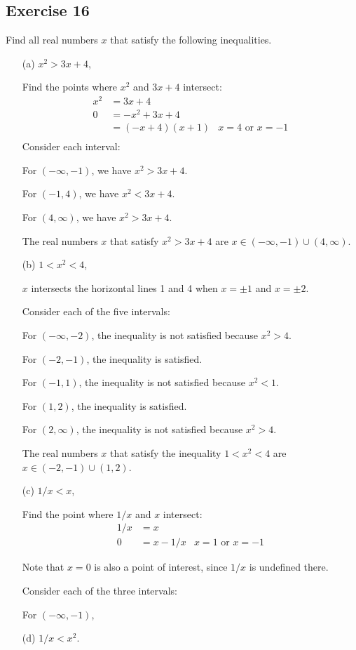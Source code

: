 \documentclass[12pt]{article}
\begin{document}
\subsection*{Exercise 16}
Find all real numbers $x$ that satisfy the following inequalities.
\begin{itemize}
\item[(a)] $x^2 > 3x + 4$,

Find the points where $x^2$ and $3x + 4$ intersect:
\begin{align*}
x^2 &= 3x + 4 \\
0 &= -x^2 + 3x + 4 \\
&= \left(-x + 4\right) \left(x + 1\right) & \text{$x = 4$ or $x = -1$}\\
\end{align*}
Consider each interval:

For $\left(-\infty, -1\right)$, we have $x^2 > 3x+4$.

For $\left(-1, 4\right)$, we have $x^2 < 3x+4$.

For $\left(4, \infty\right)$, we have $x^2 > 3x+4$.

The real numbers $x$ that satisfy $x^2 > 3x + 4$ are $x \in \left(-\infty, -1\right) \cup \left(4, \infty\right)$.
\item[(b)] $1 < x^2 < 4$,

$x$ intersects the horizontal lines 1 and 4 when $x = \pm 1$ and $x = \pm 2$.

Consider each of the five intervals:

For $\left(-\infty, -2\right)$, the inequality is not satisfied because $x^2 > 4$.

For $\left(-2, -1\right)$, the inequality is satisfied.

For $\left(-1, 1\right)$, the inequality is not satisfied because $x^2 < 1$.

For $\left(1, 2\right)$, the inequality is satisfied.

For $\left(2, \infty\right)$, the inequality is not satisfied because $x^2 > 4$.

The real numbers $x$ that satisfy the inequality $1 < x^2 < 4$ are $x \in \left(-2, -1\right) \cup \left(1, 2\right)$.
\item[(c)] $1/x < x$,

Find the point where $1/x$ and $x$ intersect:
\begin{align*}
1/x &= x \\
0 &= x - 1/x & \text{$x = 1$ or $x = -1$}
\end{align*}

Note that $x = 0$ is also a point of interest, since $1/x$ is undefined there.

Consider each of the three intervals:

For $\left(-\infty, -1\right)$, %
\item[(d)] $1/x < x^2$.
\end{itemize}
\end{document}
